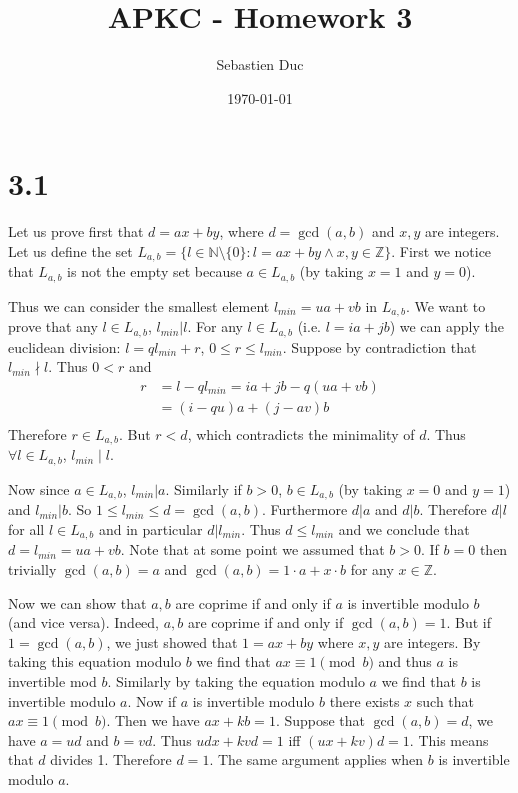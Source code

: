 \documentclass[12pt,a4paper]{article}
\title{APKC - Homework 3}
\author{Sebastien Duc}
\date{\today}
\begin{document}
\maketitle

\section*{3.1}

Let us prove first that $d = ax+by$, where $d = \gcd(a,b)$ and $x,y$ are integers.
Let us define the set $L_{a,b} = \{l\in\mathbb{N}\setminus\{0\}:l = ax + by \land x,y\in\mathbb{Z}\}$.
First we notice that $L_{a,b}$ is not the empty set because $a \in L_{a,b}$ (by taking $x = 1$ and $y = 0$).

Thus we can consider the smallest element $l_{min} = ua +vb$ in $L_{a,b}$.
We want to prove that any $l \in L_{a,b}$, $l_{min} | l$.
For any $l \in L_{a,b}$ (i.e. $l = ia+jb$) we can apply the euclidean division: $l = ql_{min} + r$, $0 \leq r \leq l_{min}$.
Suppose by contradiction that $l_{min} \nmid l$. Thus $0 < r$ and
\[
    \begin{split}
        r &= l - ql_{min} = ia +jb - q(ua +vb)\\
          &= (i - qu)a + (j-av)b\\
    \end{split}
\]
Therefore $r\in L_{a,b}$. But $r < d$, which contradicts the minimality of $d$. Thus $\forall l \in L_{a,b}$, $l_{min} \mid l$.

Now since $a \in L_{a,b}$, $l_{min} | a$. Similarly if $b > 0$, $b \in L_{a,b}$ (by taking $x = 0$ and $y = 1$) and $l_{min} | b$.
So $1 \leq l_{min} \leq d = \gcd(a,b)$. Furthermore $d | a$ and $d | b$. Therefore $d | l$ for all $l \in L_{a,b}$ and in particular $d | l_{min}$.
Thus $d \leq l_{min}$ and we conclude that $d = l_{min} = ua + vb$. 
Note that at some point we assumed that $b > 0$. If $b = 0$ then trivially $\gcd(a,b) = a$ and $\gcd(a,b) = 1\cdot a + x\cdot b$ for any $x\in\mathbb{Z}$.

Now we can show that $a,b$ are coprime if and only if $a$ is invertible modulo $b$ (and vice versa).
Indeed, $a,b$ are coprime if and only if $\gcd(a,b) = 1$.
But if $1 = \gcd(a,b)$, we just showed that $1 = ax +by$ where $x,y$ are integers. By taking this equation modulo $b$ we find that
$ax \equiv 1 \pmod b$ and thus $a$ is invertible mod $b$. Similarly by taking the equation modulo $a$ we find that $b$ is invertible modulo $a$.
Now if $a$ is invertible modulo $b$ there exists $x$ such that $ax \equiv 1 \pmod b$. Then we have $ax + kb = 1$. Suppose that 
$\gcd(a,b) = d$, we have $a = ud$ and $b = vd$. Thus $udx + kvd = 1$ iff $(ux +kv)d = 1$. This means that $d$ divides 1. 
Therefore $d = 1$. The same argument applies when $b$ is invertible modulo $a$.  
\end{document}
